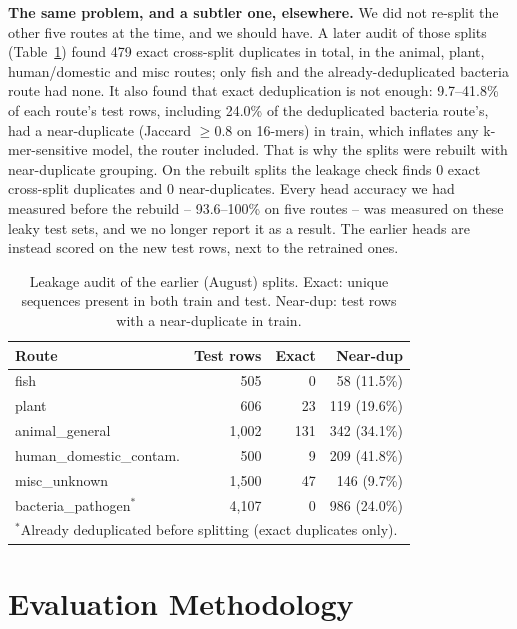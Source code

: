 \documentclass[conference]{IEEEtran}
\begin{document}
\textbf{The same problem, and a subtler one, elsewhere.} We did not re-split the other five routes at the time, and we should have. A later audit of those splits (Table~\ref{tab:leakage}) found 479 exact cross-split duplicates in total, in the animal, plant, human/domestic and misc routes; only fish and the already-deduplicated bacteria route had none. It also found that exact deduplication is not enough: 9.7--41.8\% of each route's test rows, including 24.0\% of the deduplicated bacteria route's, had a near-duplicate (Jaccard $\geq 0.8$ on 16-mers) in train, which inflates any k-mer-sensitive model, the router included. That is why the splits were rebuilt with near-duplicate grouping. On the rebuilt splits the leakage check finds 0 exact cross-split duplicates and 0 near-duplicates. Every head accuracy we had measured before the rebuild -- 93.6--100\% on five routes -- was measured on these leaky test sets, and we no longer report it as a result. The earlier heads are instead scored on the new test rows, next to the retrained ones.

\begin{table}[t]
\centering
\caption{Leakage audit of the earlier (August) splits. Exact: unique sequences present in both train and test. Near-dup: test rows with a near-duplicate in train.}
\label{tab:leakage}
\begin{tabular}{@{}lrrr@{}}
\toprule
Route & Test rows & Exact & Near-dup \\
\midrule
fish & 505 & 0 & 58 (11.5\%) \\
plant & 606 & 23 & 119 (19.6\%) \\
animal\_general & 1{,}002 & 131 & 342 (34.1\%) \\
human\_domestic\_contam. & 500 & 9 & 209 (41.8\%) \\
misc\_unknown & 1{,}500 & 47 & 146 (9.7\%) \\
bacteria\_pathogen$^{*}$ & 4{,}107 & 0 & 986 (24.0\%) \\
\bottomrule
\multicolumn{4}{l}{\footnotesize $^{*}$Already deduplicated before splitting (exact duplicates only).}
\end{tabular}
\end{table}

\section{Evaluation Methodology}
\end{document}

